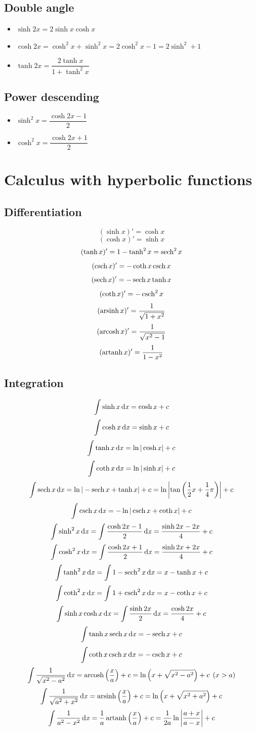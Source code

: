 \subsection{Double angle}
\begin{itemize}
	\item $\sinh 2x = 2\sinh x \cosh x$
	\item $\cosh 2x = \cosh^2 x + \sinh^2 x = 2\cosh^2 x - 1 = 2\sinh^2 + 1$
	\item $\tanh 2x = \dfrac{2\tanh x}{1 + \tanh^2 x}$
\end{itemize}

\subsection{Power descending}
\begin{itemize}
	\item $\sinh^2 x = \dfrac{\cosh 2x - 1}{2}$
	\item $\cosh^2 x = \dfrac{\cosh 2x + 1}{2}$
\end{itemize}


\section{Calculus with hyperbolic functions}
\subsection{Differentiation}
\[(\sinh x)'=\cosh x\]
\[(\cosh x)'=\sinh x\]
\[(\tanh x)'=1-\tanh^2 x = \sech^2 x\]
\[(\csch x)'=-\coth x \csch x\]
\[(\sech x)'=-\sech x \tanh x\]
\[(\coth x)'=-\csch^2 x\]
\[(\arsinh x)' = \dfrac{1}{\sqrt{1+x^2}}\]
\[(\arcosh x)' = \dfrac{1}{\sqrt{x^2-1}}\]
\[(\artanh x)' = \dfrac{1}{1-x^2}\]


\subsection{Integration}
\[\int\sinh x \dx = \cosh x + c\]
\[\int\cosh x \dx = \sinh x + c\]
\[\int \tanh x \dx = \ln |\cosh x| + c\]
\[\int \coth x \dx = \ln |\sinh x| + c\]
\[\int \sech x \dx = \ln |-\sech x + \tanh x| + c = \ln \left|\tan\left(\frac{1}{2}x+\frac{1}{4}\pi \right)\right| + c\]
\[\int \csch x \dx = -\ln|\csch x + \coth x| + c\]
\[\int \sinh^2 x \dx = \int \frac{\cosh 2x - 1}{2} \dx = \frac{\sinh 2x - 2x}{4} + c\]
\[\int \cosh^2 x \dx = \int \frac{\cosh 2x + 1}{2} \dx = \frac{\sinh 2x + 2x}{4} + c\]
\[\int \tanh^2 x \dx = \int 1-\sech^2 x \dx = x - \tanh x + c\]
\[\int \coth^2 x \dx = \int 1+\csch^2 x \dx = x - \coth x + c\]
\[\int \sinh x \cosh x \dx = \int \frac{\sinh 2x}{2} \dx = \dfrac{\cosh 2x}{4} + c\]
\[\int \tanh x \sech x \dx = -\sech x + c\]
\[\int \coth x \csch x \dx = -\csch x + c\]
\[\int \frac{1}{\sqrt{x^2-a^2}} \dx= \arcosh \left(\frac{x}{a}\right) + c = \ln \left(x + \sqrt{x^2-a^2}\right) + c \:\:  (x>a)\]
\[\int \frac{1}{\sqrt{a^2+x^2}} \dx= \arsinh \left(\frac{x}{a}\right) + c = \ln \left(x + \sqrt{x^2+a^2}\right) + c \]
\[\int \frac{1}{a^2-x^2} \dx=\frac{1}{a}\artanh \left(\frac{x}{a}\right) + c = \frac{1}{2a}\ln \left|\frac{a+x}{a-x}\right| + c\]
